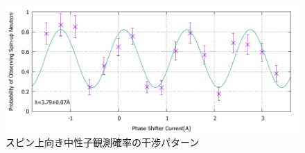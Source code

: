 \begin{figure}[h]
\begin{minipage}{0.5\hsize}
\end{minipage}
\begin{minipage}{0.5\hsize}
\includegraphics[width=\hsize]{discussion/IF_rb/Interference_rb_fit530.pdf}
\end{minipage}
\caption{スピン上向き中性子観測確率の干渉パターン}\label{Discussion_fig_IF_rb}
\end{figure}

